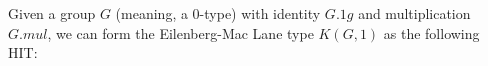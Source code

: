\documentclass[12pt]{report}
\begin{document}
Given a group $G$ (meaning, a 0-type) with identity $G.1g$ and multiplication $G.mul$, we can form the Eilenberg-Mac Lane type $K(G, 1)$ as the following HIT:
\begin{code}%
	\>[0]\AgdaSpace{}%
	\AgdaSpace{}%
	\AgdaSymbol{(}\AgdaSpace{}%
	\AgdaSymbol{:}\AgdaSpace{}%
	\AgdaSymbol{)}\AgdaSpace{}%
	\AgdaSymbol{:}\AgdaSpace{}%
	\AgdaSpace{}%
	\<%
	\\
	\>[0][@{}l@{\AgdaIndent{0}}]%
	\>[2]\AgdaSpace{}%
	\AgdaSymbol{:}\AgdaSpace{}%
	\<%
	\\
	\>[2]\AgdaSpace{}%
	\AgdaSymbol{:}\AgdaSpace{}%
	\AgdaSpace{}%
	\AgdaSymbol{$\to$}\AgdaSpace{}%
	\AgdaSymbol{(}\AgdaSpace{}%
	\AgdaOperator{\AgdaFunction{$\equiv$}}\AgdaSpace{}%
	\AgdaSymbol{)}\<%
	\\
	\>[2]\AgdaSpace{}%
	\AgdaSymbol{:}\AgdaSpace{}%
	\AgdaSpace{}%
	\AgdaSpace{}%
	\AgdaOperator{\AgdaFunction{$\equiv$}}\AgdaSpace{}%
	\AgdaSpace{}%
	\<%
	\\
	\>[2]\AgdaSpace{}%
	\AgdaSymbol{:}\AgdaSpace{}%
	\AgdaSymbol{(}\AgdaSpace{}%
	\AgdaSpace{}%
	\AgdaSymbol{:}\AgdaSpace{}%
	\AgdaSymbol{)}\AgdaSpace{}%
	\AgdaSymbol{$\to$}\AgdaSpace{}%
	\AgdaSpace{}%
	\AgdaSymbol{(}\AgdaSpace{}%
	\AgdaSpace{}%
	\AgdaSymbol{)}\AgdaSpace{}%
	\AgdaOperator{\AgdaFunction{$\equiv$}}\AgdaSpace{}%
	\AgdaSymbol{(}\AgdaSpace{}%
	\AgdaSymbol{)}\AgdaSpace{}%
	\AgdaSpace{}%
	\AgdaSymbol{(}\AgdaSpace{}%
	\AgdaSymbol{)}\<%
	\\
	\>[2]\AgdaSpace{}%

\end{code}
\end{document}
